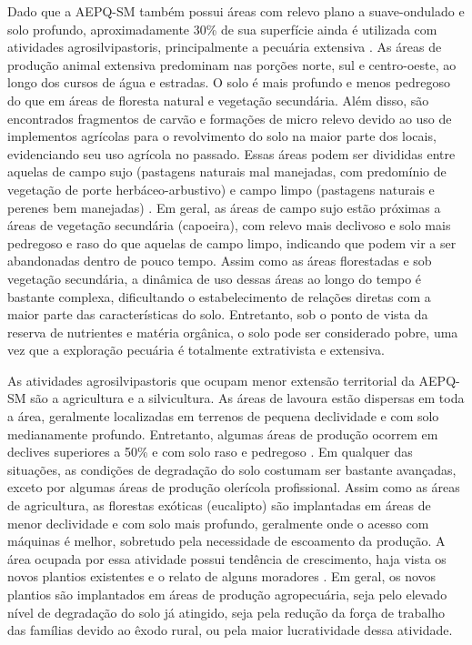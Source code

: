 Dado que a AEPQ-SM também possui áreas com relevo plano a suave-ondulado e solo profundo, aproximadamente 30\% de sua superfície ainda é utilizada com atividades agrosilvipastoris, principalmente a pecuária extensiva \cite{SamuelRosaEtAl2011a}. As áreas de produção animal extensiva predominam nas porções norte, sul e centro-oeste, ao longo dos cursos de água e estradas. O solo é mais profundo e menos pedregoso do que em áreas de floresta natural e vegetação secundária. Além disso, são encontrados fragmentos de carvão e formações de micro relevo devido ao uso de implementos agrícolas para o revolvimento do solo na maior parte dos locais, evidenciando seu uso agrícola no passado. Essas áreas podem ser divididas entre aquelas de campo sujo (pastagens naturais mal manejadas, com predomínio de vegetação de porte herbáceo-arbustivo) e campo limpo (pastagens naturais e perenes bem manejadas) \cite{SamuelRosaEtAl2011a}. Em geral, as áreas de campo sujo estão próximas a áreas de vegetação secundária (capoeira), com relevo mais declivoso e solo mais pedregoso e raso do que aquelas de campo limpo, indicando que podem vir a ser abandonadas dentro de pouco tempo. Assim como as áreas florestadas e sob vegetação secundária, a dinâmica de uso dessas áreas ao longo do tempo é bastante complexa, dificultando o estabelecimento de relações diretas com a maior parte das características do solo. Entretanto, sob o ponto de vista da reserva de nutrientes e matéria orgânica, o solo pode ser considerado pobre, uma vez que a exploração pecuária é totalmente extrativista e extensiva.


As atividades agrosilvipastoris que ocupam menor extensão territorial da AEPQ-SM são a agricultura e a silvicultura. As áreas de lavoura estão dispersas em toda a área, geralmente localizadas em terrenos de pequena declividade e com solo medianamente profundo. Entretanto, algumas áreas de produção ocorrem em declives superiores a 50\% e com solo raso e pedregoso \cite{SamuelRosaEtAl2011a}. Em qualquer das situações, as condições de degradação do solo costumam ser bastante avançadas, exceto por algumas áreas de produção olerícola profissional. Assim como as áreas de agricultura, as florestas exóticas (eucalipto) são implantadas em áreas de menor declividade e com solo mais profundo, geralmente onde o acesso com máquinas é melhor, sobretudo pela necessidade de escoamento da produção. A área ocupada por essa atividade possui tendência de crescimento, haja vista os novos plantios existentes e o relato de alguns moradores \cite{SamuelRosaEtAl2011a}. Em geral, os novos plantios são implantados em áreas de produção agropecuária, seja pelo elevado nível de degradação do solo já atingido, seja pela redução da força de trabalho das famílias devido ao êxodo rural, ou pela maior lucratividade dessa atividade.

